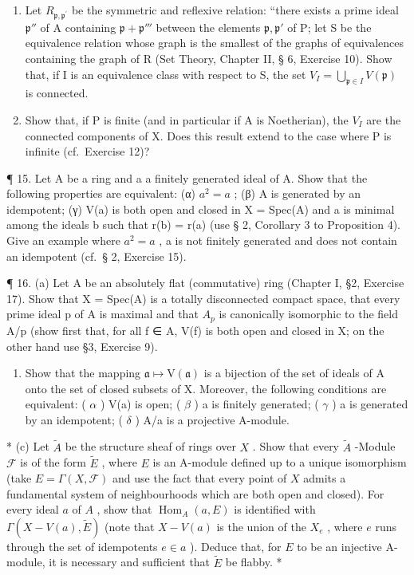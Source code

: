 \begin{enumerate}
\def\labelenumi{(\alph{enumi})}
\item
  Let \(R_{\mathfrak{p},\mathfrak{p}^{\prime}}\) be the symmetric and reflexive relation: ``there exists a prime ideal \(\mathfrak{p}''\) of A containing \(\mathfrak{p} + \mathfrak{p}'''\) between the elements \(\mathfrak{p},\mathfrak{p}'\) of P; let S be the equivalence relation whose graph is the smallest of the graphs of equivalences containing the graph of R (Set Theory, Chapter II, § 6, Exercise 10). Show that, if I is an equivalence class with respect to S, the set \(V_{I} = \bigcup_{\mathfrak{p}\in I}V(\mathfrak{p})\) is connected.
\item
  Show that, if P is finite (and in particular if A is Noetherian), the \(V_{I}\) are the connected components of X. Does this result extend to the case where P is infinite (cf.~Exercise 12)?
\end{enumerate}

¶ 15. Let A be a ring and a a finitely generated ideal of A. Show that the following properties are equivalent: (α) \(a^{2} = a\) ; (β) A is generated by an idempotent; (γ) V(a) is both open and closed in X = Spec(A) and a is minimal among the ideals b such that r(b) = r(a) (use § 2, Corollary 3 to Proposition 4). Give an example where \(a^{2} = a\) , a is not finitely generated and does not contain an idempotent (cf.~§ 2, Exercise 15).

¶ 16. (a) Let A be an absolutely flat (commutative) ring (Chapter I, §2, Exercise 17). Show that X = Spec(A) is a totally disconnected compact space, that every prime ideal p of A is maximal and that \(A_{p}\) is canonically isomorphic to the field A/p (show first that, for all f ∈ A, V(f) is both open and closed in X; on the other hand use §3, Exercise 9).

\begin{enumerate}
\def\labelenumi{(\alph{enumi})}
\setcounter{enumi}{1}
\tightlist
\item
  Show that the mapping \(\mathfrak{a}\mapsto\mathrm{V}(\mathfrak{a})\) is a bijection of the set of ideals of A onto the set of closed subsets of X. Moreover, the following conditions are equivalent: ( \(\alpha\) ) V(a) is open; ( \(\beta\) ) a is finitely generated; ( \(\gamma\) ) a is generated by an idempotent; ( \(\delta\) ) A/a is a projective A-module.
\end{enumerate}

* (c) Let \(\tilde{A}\) be the structure sheaf of rings over \(X\) . Show that every \(\tilde{A}\) -Module \(\mathcal{F}\) is of the form \(\tilde{E}\) , where \(E\) is an A-module defined up to a unique isomorphism (take \(E = \Gamma(X, \mathcal{F})\) and use the fact that every point of \(X\) admits a fundamental system of neighbourhoods which are both open and closed). For every ideal \(a\) of \(A\) , show that \(\operatorname{Hom}_A(a, E)\) is identified with \(\Gamma(X - V(a), \tilde{E})\) (note that \(X - V(a)\) is the union of the \(X_e\) , where \(e\) runs through the set of idempotents \(e \in a\) ). Deduce that, for \(E\) to be an injective A-module, it is necessary and sufficient that \(\tilde{E}\) be flabby. *

